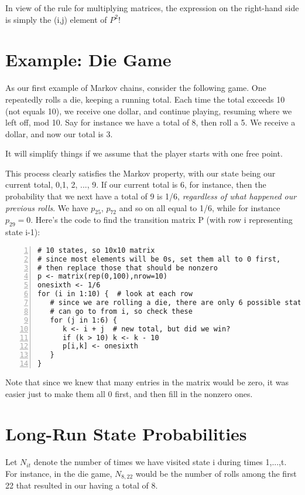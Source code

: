 In view of the rule for multiplying matrices, the expression on the
right-hand side is simply the (i,j) element of $P^2$!

\section{Example:  Die Game}

As our first example of Markov chains, consider the following game.  One
repeatedly rolls a die, keeping a running total.  Each time the total
exceeds 10 (not equals 10), we receive one dollar, and continue playing,
resuming where we left off, mod 10.  Say for instance we have a total of
8, then roll a 5.  We receive a dollar, and now our total is 3.

It will simplify things if we assume that the player starts with one
free point.

This process clearly satisfies the Markov property, with our state being
our current total, 0,1, 2, ..., 9.  If our current total is 6, for
instance, then the probability that we next have a total of 9 is 1/6,
{\it regardless of what happened our previous rolls}.  We have $p_{25}$,
$p_{72}$ and so on all equal to 1/6, while for instance $p_{29} = 0$.
Here's the code to find the transition matrix P (with row i representing
state i-1):

\begin{lstlisting}[numbers=left]
# 10 states, so 10x10 matrix
# since most elements will be 0s, set them all to 0 first, 
# then replace those that should be nonzero
p <- matrix(rep(0,100),nrow=10)  
onesixth <- 1/6
for (i in 1:10) {  # look at each row
   # since we are rolling a die, there are only 6 possible states we 
   # can go to from i, so check these
   for (j in 1:6) {  
      k <- i + j  # new total, but did we win?
      if (k > 10) k <- k - 10 
      p[i,k] <- onesixth
   }
}
\end{lstlisting}

Note that since we knew that many entries in the matrix would be zero, it
was easier just to make them all 0 first, and then fill in the nonzero
ones.

\section{Long-Run State Probabilities}

Let $N_{it}$ denote the number of times we have visited state i during
times 1,...,t.  For instance, in the die game, $N_{8,22}$ would be the
number of rolls among the first 22 that resulted in our having a total
of 8.

